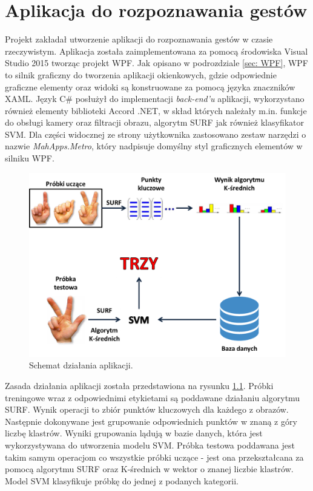 \chapter{Aplikacja do rozpoznawania gestów}
Projekt zakładał utworzenie aplikacji do rozpoznawania gestów w czasie rzeczywistym. Aplikacja została zaimplementowana za pomocą środowiska Visual Studio 2015 tworząc projekt WPF. Jak opisano w podrozdziale \ref{sec: WPF}, WPF to silnik graficzny do tworzenia aplikacji okienkowych, gdzie odpowiednie graficzne elementy oraz widoki są konstruowane za pomocą języka znaczników XAML. Język C\# posłużył do implementacji \textit{back-end'u} aplikacji, wykorzystano również elementy biblioteki Accord .NET, w skład których należały m.in. funkcje do obsługi kamery oraz filtracji obrazu, algorytm SURF jak również klasyfikator SVM. Dla części widocznej ze strony użytkownika zastosowano zestaw narzędzi o nazwie \textit{MahApps.Metro}, który nadpisuje domyślny styl graficznych elementów w silniku WPF.

\begin{figure}[h]
	\centering
	\includegraphics[width=16cm]{ApplicationFlowChart}
	\centering
	\caption{Schemat działania aplikacji.}
	\label{im: ApplicationFlowChart}
\end{figure}

Zasada działania aplikacji została przedstawiona na rysunku \ref{im: ApplicationFlowChart}. Próbki treningowe wraz z odpowiednimi etykietami są poddawane działaniu algorytmu SURF. Wynik operacji to zbiór punktów kluczowych dla każdego z obrazów. Następnie dokonywane jest grupowanie odpowiednich punktów w znaną z góry liczbę klastrów. Wyniki grupowania lądują w bazie danych, która jest wykorzystywana do utworzenia modelu SVM. 
Próbka testowa poddawana jest takim samym operacjom co wszystkie próbki uczące - jest ona przekształcana za pomocą algorytmu SURF oraz K-średnich w wektor o znanej liczbie klastrów. Model SVM klasyfikuje próbkę do jednej z podanych kategorii. 


